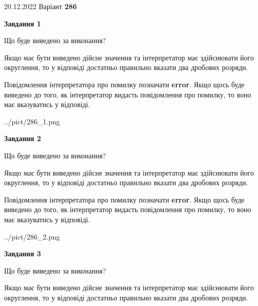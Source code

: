 \documentclass[12pt, ukrainian]{article}
\begin{document}
{20.12.2022 Варіант \No \textbf { 286 }\par}
{
\begin {Large}

{\begin {center}\textbf{Завдання 1}\end {center}}\par
Що буде виведено за виконання? \par

Якщо має бути виведено дійсне значення та інтерпретатор має здійснювати його округлення, 
то у відповіді достатньо правильно вказати два дробових розряди.

Повідомлення інтерпретатора про помилку позначати \textbf{error}.
Якщо щось буде виведено до того, як інтерпретатор видасть повідомлення про помилку, 
то воно має вказуватись у відповіді. \par

\begin{center}
	{../pict/286_1.png}
\end{center}
\newpage

{\begin {center}\textbf{Завдання 2}\end {center}}\par
Що буде виведено за виконання? \par

Якщо має бути виведено дійсне значення та інтерпретатор має здійснювати його округлення, 
то у відповіді достатньо правильно вказати два дробових розряди.

Повідомлення інтерпретатора про помилку позначати \textbf{error}.
Якщо щось буде виведено до того, як інтерпретатор видасть повідомлення про помилку, 
то воно має вказуватись у відповіді. \par

\begin{center}
	{../pict/286_2.png}
\end{center}
\newpage

{\begin {center}\textbf{Завдання 3}\end {center}}\par
Що буде виведено за виконання? \par

Якщо має бути виведено дійсне значення та інтерпретатор має здійснювати його округлення, 
то у відповіді достатньо правильно вказати два дробових розряди.


\end{Large}}
\end{document}
